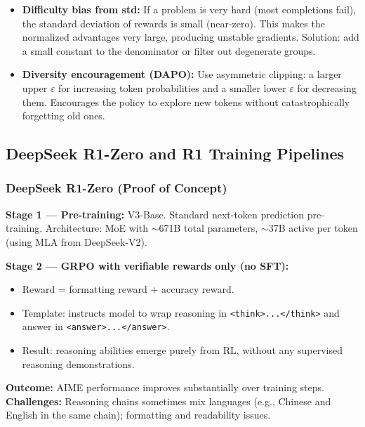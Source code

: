 \documentclass[11pt, a4paper]{article}
\begin{document}
\begin{notebox}
\begin{itemize}[leftmargin=1.5em]
  \item \textbf{Difficulty bias from std:} If a problem is very hard (most completions fail), the standard deviation of rewards is small (near-zero). This makes the normalized advantages very large, producing unstable gradients. Solution: add a small constant to the denominator or filter out degenerate groups.
  \item \textbf{Diversity encouragement (DAPO):} Use asymmetric clipping: a larger upper $\varepsilon$ for increasing token probabilities and a smaller lower $\varepsilon$ for decreasing them. Encourages the policy to explore new tokens without catastrophically forgetting old ones.
\end{itemize}
\end{notebox}

\subsection{DeepSeek R1-Zero and R1 Training Pipelines}

\subsubsection{DeepSeek R1-Zero (Proof of Concept)}

\begin{orangebox}
\textbf{Stage 1 --- Pre-training:} V3-Base. Standard next-token prediction pre-training. Architecture: MoE with $\sim$671B total parameters, $\sim$37B active per token (using MLA from DeepSeek-V2).

\textbf{Stage 2 --- GRPO with verifiable rewards only (no SFT):}
\begin{itemize}[leftmargin=1.5em]
  \item Reward = formatting reward + accuracy reward.
  \item Template: instructs model to wrap reasoning in \texttt{<think>...</think>} and answer in \texttt{<answer>...</answer>}.
  \item Result: reasoning abilities emerge purely from RL, without any supervised reasoning demonstrations.
\end{itemize}

\textbf{Outcome:} AIME performance improves substantially over training steps. \\
\textbf{Challenges:} Reasoning chains sometimes mix languages (e.g., Chinese and English in the same chain); formatting and readability issues.
\end{orangebox}
\end{document}
